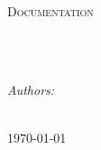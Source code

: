 \documentclass[
10pt, %
oneside, %
chapterinoneline,%
english, %
onehalfspacing, %
headsepline, %
]{style} %
\begin{document}
\frontmatter %

\pagestyle{plain} %


\begin{titlepage}
\begin{center}

{\scshape\LARGE \univname\par}\vspace{1.5cm} %
\textsc{\Large Documentation}\\[0.5cm] %

\HRule \\[0.4cm] %
{\huge \bfseries \ttitle\par}\vspace{0.4cm} %
\HRule \\[1.5cm] %

\begin{minipage}[t]{0.4\textwidth}
\begin{flushleft} \large
\emph{Authors:}\\
{\authorname} %
\end{flushleft}
\end{minipage}
\begin{minipage}[t]{0.4\textwidth}
\begin{flushright} \large

\end{flushright}
\end{minipage}\\[3cm]


\vfill
{\large \today}\\[4cm] %

\vfill
\end{center}
\end{titlepage}
\end{document}
